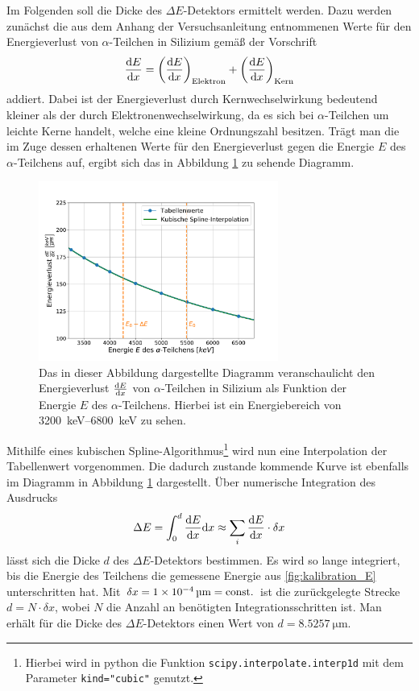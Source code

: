 Im Folgenden soll die Dicke des $\Delta E$-Detektors ermittelt werden.
Dazu werden zunächst die aus dem Anhang der Versuchsanleitung\cite{wwu} entnommenen Werte für den Energieverlust von $\alpha$-Teilchen in Silizium gemäß der Vorschrift
\begin{align}
	\dv{E}{x}= \left( \dv{E}{x}\right)_\text{Elektron} + \left(\dv{E}{x}\right)_\text{Kern}
\end{align}
addiert.
Dabei ist der Energieverlust durch Kernwechselwirkung bedeutend kleiner als der durch Elektronenwechselwirkung, da es sich bei $\alpha$-Teilchen um leichte Kerne handelt, welche eine kleine Ordnungszahl besitzen.
Trägt man die im Zuge dessen erhaltenen Werte für den Energieverlust gegen die Energie $E$ des $\alpha$-Teilchens auf, ergibt sich das in Abbildung \ref{EnergyLossSpectrum} zu sehende Diagramm.
\begin{figure}[ht]
	\centering
	\includegraphics[width=0.7\textwidth]{src/EnergyLossSpectrum}
	\caption{Das in dieser Abbildung dargestellte Diagramm veranschaulicht den Energieverlust $\dv{E}{x}$ von $\alpha$-Teilchen in Silizium als Funktion der Energie $E$ des $\alpha$-Teilchens. Hierbei ist ein Energiebereich von \SIrange{3200}{6800}{\kilo\electronvolt} zu sehen.}
	\label{EnergyLossSpectrum}
\end{figure}
Mithilfe eines kubischen Spline-Algorithmus\footnote{Hierbei wird in python die Funktion \texttt{scipy.interpolate.interp1d} mit dem Parameter \texttt{kind="cubic"} genutzt.} wird nun eine Interpolation der Tabellenwert vorgenommen.
Die dadurch zustande kommende Kurve ist ebenfalls im Diagramm in Abbildung \ref{EnergyLossSpectrum} dargestellt.
Über numerische Integration des Ausdrucks
\begin{align}
	\Delta E = \int_{0}^{d} \dv{E}{x} (E) \dd x \approx \sum_i \dv{E}{x} (E_i) \cdot \delta x
\end{align}
lässt sich die Dicke $d$ des $\Delta E$-Detektors bestimmen.
Es wird so lange integriert, bis die Energie des Teilchens die gemessene Energie aus \cref{fig:kalibration_E} unterschritten hat.
Mit $\delta x = \SI{1e-4}{\micro\meter} = \text{const.}$ ist die zurückgelegte Strecke $d = N \cdot \delta x$, wobei $N$ die Anzahl an benötigten Integrationsschritten ist.
Man erhält für die Dicke des $\Delta E$-Detektors einen Wert von $d=\SI{8,5257}{\micro\meter}$. 

